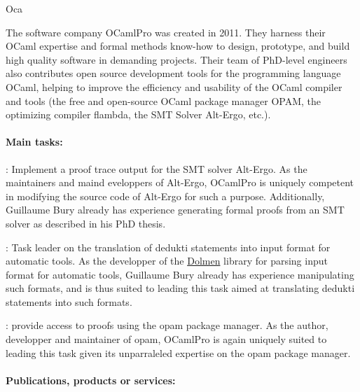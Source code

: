 \begin{sitedescription}{Oca}


The software company OCamlPro was created in 2011. They harness their OCaml expertise and formal methods know-how to design, prototype, and build high quality software in demanding projects. Their team of PhD-level engineers also contributes open source development tools for the programming language OCaml, helping to improve the efficiency and usability of the OCaml compiler and tools (the free and open-source OCaml package manager OPAM, the optimizing compiler flambda, the SMT Solver Alt-Ergo, etc.).

\paragraph*{Main tasks:}

\begin{compactitem}
\item {}: Implement a proof trace output for
  the SMT solver Alt-Ergo. As the maintainers and maind eveloppers of Alt-Ergo,
  OCamlPro is uniquely competent in modifying the source code of Alt-Ergo
  for such a purpose. Additionally, Guillaume Bury already has experience
  generating formal proofs from an SMT solver as described in his PhD
  thesis\cite{BURY19}.
\item {}: Task leader on the translation of
  dedukti statements into input format for automatic tools. As the developper
  of the \href{https://github.com/Gbury/dolmen}{Dolmen} library for parsing input format for automatic
  tools, Guillaume Bury already has experience manipulating such formats,
  and is thus suited to leading this task aimed at translating dedukti
  statements into such formats.
\item {}: provide access to proofs using the opam
  package manager. As the author, developper and maintainer of opam,
  OCamlPro is again uniquely suited to leading this task given its
  unparraleled expertise on the opam package manager.
\end{compactitem}

\paragraph*{Publications, products or services:}


\end{sitedescription}
